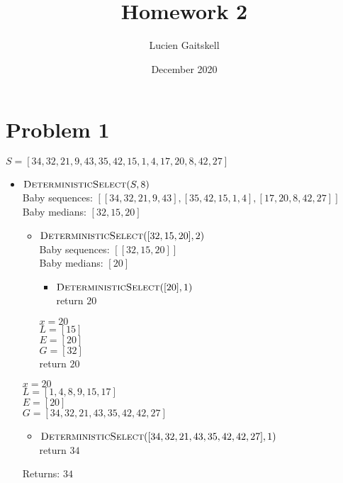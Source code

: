 \documentclass{article}
\title{Homework 2}
\author{Lucien Gaitskell}
\date{December 2020}
\begin{document}
\maketitle

\section{Problem 1}

$S = [34,32,21,9,43,35,42,15,1,4,17,20,8,42,27]$

\begin{itemize}
    \item $\textproc{DeterministicSelect}(S, 8)$ \\
    Baby sequences: $[[34,32,21,9,43],[35,42,15,1,4],[17,20,8,42,27]]$
    Baby medians: $[32,15,20]$

    \begin{itemize}
        \item $\textproc{DeterministicSelect}([32, 15, 20],2)$ \\
        Baby sequences: $[[32,15,20]]$ \\
        Baby medians: $[20]$

        \begin{itemize}
            \item $\textproc{DeterministicSelect}([20],1)$ \\
            return $20$

        \end{itemize}
        $x = 20 $ \\
        $L = [15] $ \\
        $E = [20] $ \\
        $G = [32] $ \\
        return $20$

    \end{itemize}

    $x = 20$ \\
    $L = [1,4,8,9,15,17] $ \\
    $E = [20] $ \\
    $G = [34,32,21,43,35,42,42,27]$

    \begin{itemize}
        \item $\textproc{DeterministicSelect}([34,32,21,43,35,42,42,27],1)$ \\
        return $34$
    \end{itemize}

    Returns: $34$
\end{itemize}
\end{document}
